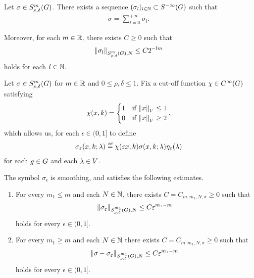 \begin{corollary}
    Let $\sigma \in \SymbolClass m {\rho, \delta}$.
    There exists a sequence $(\sigma_l)_{l \in \N} \subset \SmoothingSymbols$
    such that
    \begin{align*}
        \sigma = \sum_{l = 0}^{+\infty} \sigma_l.
    \end{align*}

    Moreover, for each $m \in \R$,
    there exists $C \geq 0$ such that
    \begin{align*}
        \SymbolSemiNorm m {\rho, \delta} N {\sigma_l} \leq C 2^{-l m}
    \end{align*}
    holds for each $l \in \N$.
\end{corollary}

\begin{corollary}
    Let $\sigma \in \SymbolClass m {\rho, \delta}$ for $m \in \R$ and $0 \leq \rho, \delta \leq 1$.
    Fix a cut-off function $\chi \in \SmoothFunctions \Group$ satisfying
    \begin{align*}
        \chi(x, k) =
        \begin{cases}
            1 & \text{if } \norm x \leq 1\\
            0 & \text{if } \norm x \geq 2
        \end{cases},
    \end{align*}
    which allows us, for each $\epsilon \in (0, 1]$ to define
    \begin{align*}
        \sigma_\epsilon(x, k; \lambda) \defeq \chi(\epsilon x, k) \sigma(x, k; \lambda) \eta_\epsilon(\lambda)
    \end{align*}
    for each $g \in \Group$ and each $\lambda \in \VectorSpace$.

    The symbol $\sigma_\epsilon$ is smoothing,
    and satisfies the following estimates.
    \begin{enumerate}
        \item For every $m_1 \leq m$ and each $N \in \N$,
            there exists $C = C_{m, m_1, N, \sigma} \geq 0$ such that
            \begin{align*}
                \SymbolSemiNorm {m_1} {\rho, \delta} N {\sigma_\epsilon}
                \leq C \epsilon^{m_1 - m}
            \end{align*}
            holds for every $\epsilon \in (0, 1]$.
        \item For every $m_1 \geq m$ and each $N \in \N$
            there exists $C = C_{m, m_1, N, \sigma} \geq 0$ such that
            \begin{align*}
                \SymbolSemiNorm {m_1} {\rho, \delta} N {\sigma - \sigma_\epsilon}
                \leq C \epsilon^{m_1 - m}
            \end{align*}
            holds for every $\epsilon \in (0, 1]$.
    \end{enumerate}
\end{corollary}


